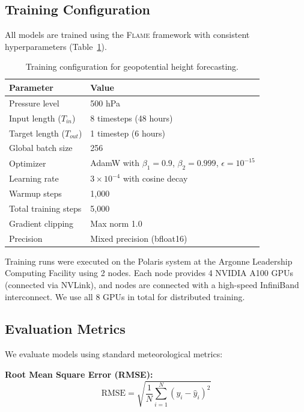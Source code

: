 \documentclass[runningheads]{llncs}
\newcommand{\method}{\textsc{Flame}}
\begin{document}
\subsection{Training Configuration}

All models are trained using the \method{} framework with consistent hyperparameters (Table~\ref{tab:training_config}).

\begin{table}[t]
    \centering
    \caption{Training configuration for geopotential height forecasting.}
    \label{tab:training_config}
    \begin{tabular}{ll}
        \toprule
        \textbf{Parameter} & \textbf{Value} \\
        \midrule
        Pressure level & 500 hPa \\
        Input length ($T_{in}$) & 8 timesteps (48 hours) \\
        Target length ($T_{out}$) & 1 timestep (6 hours) \\
        Global batch size & 256 \\
        Optimizer & AdamW with $\beta_1=0.9$, $\beta_2=0.999$, $\epsilon=10^{-15}$ \\
        Learning rate & $3 \times 10^{-4}$ with cosine decay \\
        Warmup steps & 1,000 \\
        Total training steps & 5,000 \\
        Gradient clipping & Max norm 1.0 \\
        Precision & Mixed precision (bfloat16) \\
        \bottomrule
    \end{tabular}
\end{table}

Training runs were executed on the Polaris system at the Argonne Leadership Computing Facility using 2 nodes. Each node provides 4 NVIDIA A100 GPUs (connected via NVLink), and nodes are connected with a high-speed InfiniBand interconnect. We use all 8 GPUs in total for distributed training.

\subsection{Evaluation Metrics}

We evaluate models using standard meteorological metrics:

\textbf{Root Mean Square Error (RMSE):}
\begin{equation}
    \text{RMSE} = \sqrt{\frac{1}{N}\sum_{i=1}^{N}(y_i - \hat{y}_i)^2}
\end{equation}
\end{document}
